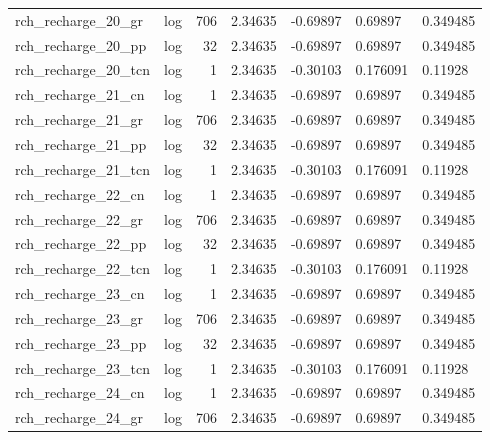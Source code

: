 \documentclass{article}
\begin{document}
\begin{center}
\begin{landscape}
\begin{longtable}{llrllll}
 rch\_recharge\_20\_gr &       log &    706 &        2.34635 &       -0.69897 &        0.69897 &           0.349485 \\
 rch\_recharge\_20\_pp &       log &     32 &        2.34635 &       -0.69897 &        0.69897 &           0.349485 \\
rch\_recharge\_20\_tcn &       log &      1 &        2.34635 &       -0.30103 &       0.176091 &            0.11928 \\
 rch\_recharge\_21\_cn &       log &      1 &        2.34635 &       -0.69897 &        0.69897 &           0.349485 \\
 rch\_recharge\_21\_gr &       log &    706 &        2.34635 &       -0.69897 &        0.69897 &           0.349485 \\
 rch\_recharge\_21\_pp &       log &     32 &        2.34635 &       -0.69897 &        0.69897 &           0.349485 \\
rch\_recharge\_21\_tcn &       log &      1 &        2.34635 &       -0.30103 &       0.176091 &            0.11928 \\
 rch\_recharge\_22\_cn &       log &      1 &        2.34635 &       -0.69897 &        0.69897 &           0.349485 \\
 rch\_recharge\_22\_gr &       log &    706 &        2.34635 &       -0.69897 &        0.69897 &           0.349485 \\
 rch\_recharge\_22\_pp &       log &     32 &        2.34635 &       -0.69897 &        0.69897 &           0.349485 \\
rch\_recharge\_22\_tcn &       log &      1 &        2.34635 &       -0.30103 &       0.176091 &            0.11928 \\
 rch\_recharge\_23\_cn &       log &      1 &        2.34635 &       -0.69897 &        0.69897 &           0.349485 \\
 rch\_recharge\_23\_gr &       log &    706 &        2.34635 &       -0.69897 &        0.69897 &           0.349485 \\
 rch\_recharge\_23\_pp &       log &     32 &        2.34635 &       -0.69897 &        0.69897 &           0.349485 \\
rch\_recharge\_23\_tcn &       log &      1 &        2.34635 &       -0.30103 &       0.176091 &            0.11928 \\
 rch\_recharge\_24\_cn &       log &      1 &        2.34635 &       -0.69897 &        0.69897 &           0.349485 \\
 rch\_recharge\_24\_gr &       log &    706 &        2.34635 &       -0.69897 &        0.69897 &           0.349485 \\

\end{longtable}
\end{landscape}
\end{center}
\end{document}

